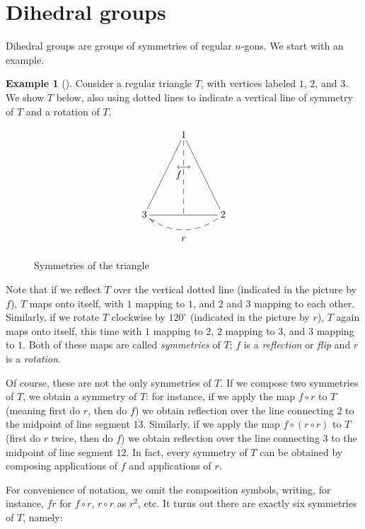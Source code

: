 \documentclass[10pt,]{book}
\theoremstyle{plain}
\theoremstyle{definition}
\theoremstyle{definition}
\theoremstyle{definition}
\newtheorem{example}[theorem]{Example}
\theoremstyle{definition}
\numberwithin{equation}{section}
\begin{document}
\section[{Dihedral groups}]{Dihedral groups}\label{dihedralgps}
Dihedral groups are groups of symmetries of regular \(n\)-gons. We start with an example.%
\begin{example}[]\label{D3}
Consider a regular triangle \(T\), with vertices labeled \(1\), \(2\), and \(3\). We show \(T\) below, also using dotted lines to indicate a vertical line of symmetry of \(T\) and a rotation of \(T\).%
\begin{figure}
\centering
{
 \[\xymatrix{&1\ar@{-}[ldd]\ar@{-}[rdd]\ar@{--}[dd]\\ &\stackrel{\longleftrightarrow}{\hspace{-10pt}f} &
\\ 3\ar@{-}[rr]&&2\ar@{-->}@/^{15pt}/[ll]^{\begin{array}{ccc}&r& \end{array}}}\]
}
\caption{Symmetries of the triangle\label{figure-8}}
\end{figure}
Note that if we reflect \(T\) over the vertical dotted line (indicated in the picture by \(f\)), \(T\) maps onto itself, with \(1\) mapping to \(1\), and \(2\) and \(3\) mapping to each other. Similarly, if we rotate \(T\) clockwise by \(120^{\circ}\) (indicated in the picture by \(r\)), \(T\) again maps onto itself, this time with \(1\) mapping to \(2\), \(2\) mapping to \(3\), and \(3\) mapping to \(1\). Both of these maps are called \emph{symmetries} of \(T\); \(f\) is a \emph{reflection} or \emph{flip} and \(r\) is a \emph{rotation}.%
\par
Of course, these are not the only symmetries of \(T\). If we compose two symmetries of \(T\), we obtain a symmetry of \(T\): for instance, if we apply the map \(f\circ r\) to \(T\) (meaning first do \(r\), then do \(f\)) we obtain reflection over the line connecting \(2\) to the midpoint of line segment \(\overline{13}\). Similarly, if we apply the map \(f\circ (r\circ r)\) to \(T\) (first do \(r\) twice, then do \(f\)) we obtain reflection over the line connecting \(3\) to the midpoint of line segment \(\overline{12}\). In fact, every symmetry of \(T\) can be obtained by composing applications of \(f\) and applications of \(r\).%
\par
For convenience of notation, we omit the composition symbols, writing, for instance, \(fr\) for \(f\circ r\), \(r\circ r\) as \(r^2\), etc. It turns out there are exactly six symmetries of \(T\), namely: \leavevmode%

\end{example}
\end{document}
